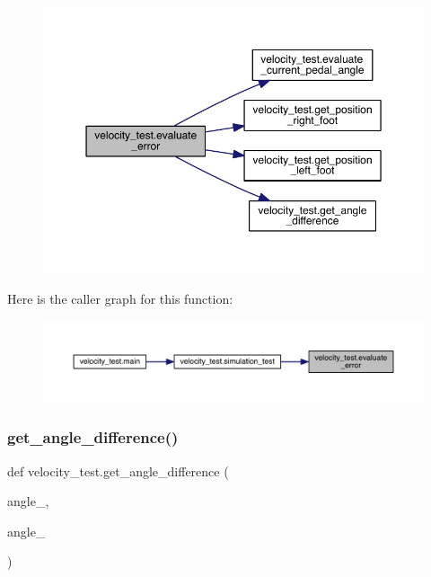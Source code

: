 \begin{figure}[H]
\begin{center}
\leavevmode
\includegraphics[width=350pt]{namespacevelocity__test_a39ca1f32ae8d0b7035cb207c50722da0_cgraph}
\end{center}
\end{figure}
Here is the caller graph for this function\+:\nopagebreak
\begin{figure}[H]
\begin{center}
\leavevmode
\includegraphics[width=350pt]{namespacevelocity__test_a39ca1f32ae8d0b7035cb207c50722da0_icgraph}
\end{center}
\end{figure}
\mbox{\label{namespacevelocity__test_a3b7c195a552b65290f4344865f48948e}} 
\subsubsection{\texorpdfstring{get\_angle\_difference()}{get\_angle\_difference()}}
{\footnotesize\ttfamily def velocity\+\_\+test.\+get\+\_\+angle\+\_\+difference (\begin{DoxyParamCaption}\item[{}]{angle\+\_,  }\item[{}]{angle\+\_ }\end{DoxyParamCaption})}



